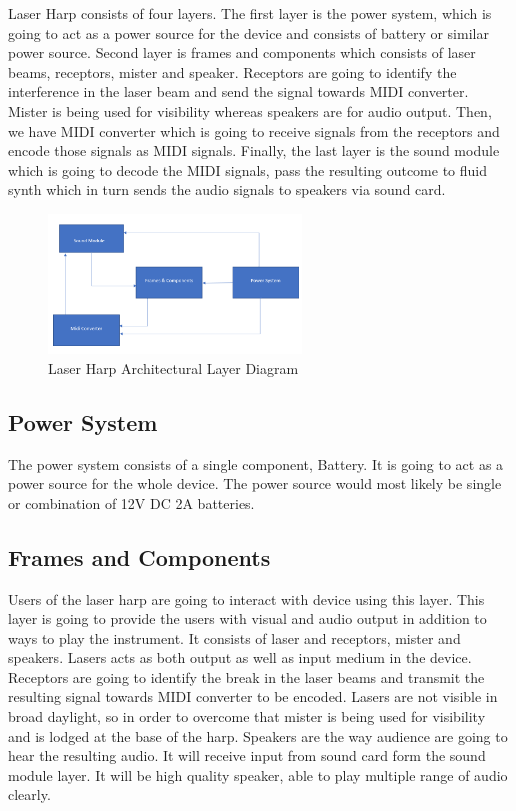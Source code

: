 Laser Harp consists of four layers. The first layer is the power system, which is going to act as a power source for the device and consists of battery or similar power source. Second layer is frames and components which consists of laser beams, receptors, mister and speaker. Receptors are going to identify the interference in the laser beam and send the signal towards MIDI converter. Mister is being used for visibility whereas speakers are for audio output. Then, we have MIDI converter which is going to receive signals from the receptors and encode those signals as MIDI signals. Finally, the last layer is the sound module which is going to decode the MIDI signals, pass the resulting outcome to fluid synth which in turn sends the audio signals to speakers via sound card. 

\begin{figure}[h!]
	\centering
 	\includegraphics[width=0.60\textwidth]{images/layers}
 \caption{Laser Harp Architectural Layer Diagram}
\end{figure}

\subsection{Power System}
The power system consists of a single component, Battery. It is going to act as a power source for the whole device. The power source would most likely be single or combination of 12V DC 2A batteries.

\subsection{Frames and Components}
Users of the laser harp are going to interact with device using this layer. This layer is going to provide the users with visual and audio output in addition to ways to play the instrument. It consists of laser and receptors, mister and speakers. Lasers acts as both output as well as input medium in the device. Receptors are going to identify the break in the laser beams and transmit the resulting signal towards MIDI converter to be encoded. Lasers are not visible in broad daylight, so  in order to overcome that mister is being used for visibility and is lodged at the base of the harp. Speakers are the way audience are going to hear the resulting audio. It will receive input from sound card form the sound module layer. It will be high quality speaker, able to play multiple range of audio clearly.


